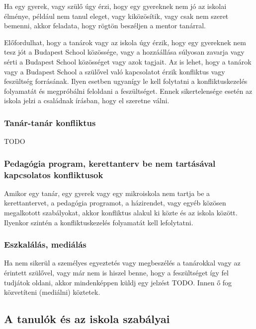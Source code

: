Ha egy gyerek, vagy szülő úgy érzi, hogy egy gyereknek nem jó az iskolai
élménye, például nem tanul eleget, vagy kiközösítik, vagy csak nem
szeret bemenni, akkor feladata, hogy rögtön beszéljen a mentor tanárral.

Előfordulhat, hogy a tanárok vagy az iskola úgy érzik, hogy egy
gyereknek nem tesz jót a Budapest School közössége, vagy a hozzáállása
súlyosan zavarja vagy sérti a Budapest School közösséget vagy azok
tagjait. Az is lehet, hogy a tanárok vagy a Budapest School a szülővel
való kapcsolatot érzik konfliktus vagy feszültség forrásának. Ilyen
esetben ugyanígy le kell folytatni a konfliktuskezelés folyamatát és
megpróbálni feloldani a feszültséget. Ennek sikertelensége esetén az
iskola jelzi a családnak írásban, hogy el szeretne válni.

\subsubsection{Tanár-tanár
konfliktus}\label{tanuxe1r-tanuxe1r-konfliktus}

TODO

\subsubsection{Pedagógia program, kerettanterv be nem tartásával
kapcsolatos
konfliktusok}\label{pedaguxf3gia-program-kerettanterv-be-nem-tartuxe1suxe1val-kapcsolatos-konfliktusok}

Amikor egy tanár, egy gyerek vagy egy mikroiskola nem tartja be a
kerettantervet, a pedagógia programot, a házirendet, vagy egyéb közösen
megalkotott szabályokat, akkor konfliktus alakul ki közte és az iskola
között. Ilyenkor szintén a konfliktuskezelés folyamatát kell
lefolytatni.

\subsubsection{Eszkalálás,
mediálás}\label{eszkaluxe1luxe1s-mediuxe1luxe1s}

Ha nem sikerül a személyes egyeztetés vagy megbeszélés a tanárokkal vagy
az érintett szülővel, vagy már nem is hiszel benne, hogy a feszültséget
így fel tudjátok oldani, akkor mindenképpen küldj egy jelzést TODO. Innen ő fog közvetíteni (mediálni) köztetek.

\subsection{A tanulók és az iskola
szabályai}\label{a-tanuluxf3k-uxe9s-az-iskola-szabuxe1lyai}

